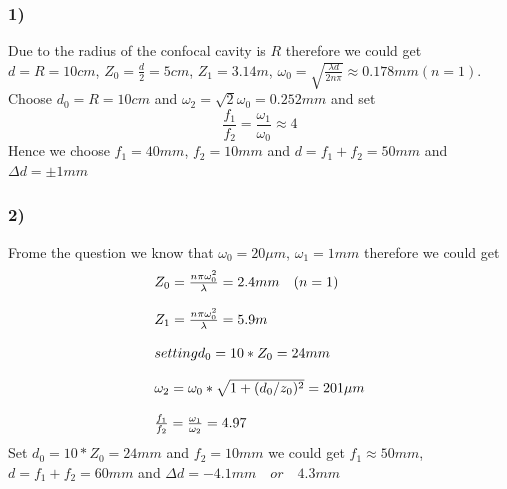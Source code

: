 \documentclass{article}
\begin{document}
\subsubsection{1)}
Due to the radius of the confocal cavity is $R$ therefore we could get $d=R=10cm$, $Z_0=\frac{d}{2}=5cm$, $Z_1=3.14m$, $\omega_0=\sqrt{\frac{\lambda d}{2n\pi}}\approx 0.178mm(n=1)$. Choose $d_0=R=10cm$ and   $\omega_2=\sqrt{2}\omega_0=0.252mm$ and set
\begin{equation}\label{key}
	\frac{f_1}{f_2}=\frac{\omega_1}{\omega_0}\approx 4
\end{equation}
Hence we choose $f_1=40mm$, $f_2=10mm$ and $d=f_1+f_2=50mm$ and $\Delta d=\pm1mm$

\subsubsection{2)}
Frome the question we know that $\omega_0=20\mu m$, $\omega_1=1mm$ therefore we could get
\begin{equation}\label{key}
	\begin{array}{l}
	Z_0=\frac{n\pi\omega_0^2}{\lambda}=2.4mm\quad (n=1)\\
	\\
	Z_1=\frac{n\pi\omega_0^2}{\lambda}=5.9m\\
	\\
	setting d_0=10*Z_0=24mm\\
	\\
	\omega_2=\omega_0*\sqrt{1+(d_0\//z_0)^2}=201\mu m\\
	\\
	\frac{f_1}{f_2}=\frac{\omega_1}{\omega_2}=4.97
	\end{array}
\end{equation}
Set $d_0=10*Z_0=24mm$ and $f_2=10mm$ we could get $f_1\approx50mm$, $d=f_1+f_2=60mm$ and $\Delta d=-4.1mm \quad or \quad  4.3 mm$
\end{document}
